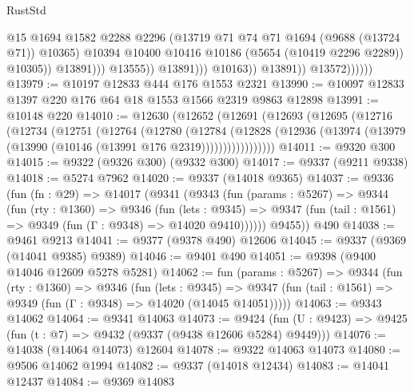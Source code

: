 \begin{lexlean}{RustStd}
\begin{coremodule}
                                            @15
                                            @1694
                                            @1582
                                            @2288
                                            @2296
                                            (@13719 @71 @74 @71 @1694 (@9688 (@13724 @71)) @10365)
                                            @10394
                                            @10400
                                            @10416
                                            @10186
                                            (@5654 (@10419 @2296 @2289))
                                            @10305))
                                        @13891)))
                                  @13555))
                              @13891)))
                        @10163))
                    @13891))
                @13572))))))
@13979 := @10197 @12833 @444 @176 @1553 @2321
@13990 := @10097 @12833 @1397 @220 @176 @64 @18 @1553 @1566 @2319 @9863 @12898
@13991 := @10148 @220
@14010 := @12630
    (@12652
      (@12691
        (@12693
          (@12695
            (@12716
              (@12734
                (@12751
                  (@12764
                    (@12780
                      (@12784
                        (@12828
                          (@12936
                            (@13974 (@13979 (@13990 (@10146 (@13991 @176 @2319)))))))))))))))))
@14011 := @9320 @300
@14015 := @9322 (@9326 @300) (@9332 @300)
@14017 := @9337 (@9211 @9338)
@14018 := @5274 @7962
@14020 := @9337 (@14018 @9365)
@14037 := @9336
    (fun (fn : @29) =>
    @14017
      (@9341
        (@9343
          (fun (params : @5267) =>
          @9344
            (fun (rty : @1360) =>
            @9346
              (fun (lets : @9345) =>
              @9347 (fun (tail : @1561) => @9349 (fun (Γ : @9348) => @14020 @9410))))))
        @9455))
    @490
@14038 := @9461 @9213
@14041 := @9377 (@9378 @490) @12606
@14045 := @9337 (@9369 (@14041 @9385) @9389)
@14046 := @9401 @490
@14051 := @9398 (@9400 @14046 @12609 @5278 @5281)
@14062 := fun (params : @5267) =>
  @9344
    (fun (rty : @1360) =>
    @9346
      (fun (lets : @9345) =>
      @9347 (fun (tail : @1561) => @9349 (fun (Γ : @9348) => @14020 (@14045 @14051)))))
@14063 := @9343 @14062
@14064 := @9341 @14063
@14073 := @9424
    (fun (U : @9423) => @9425 (fun (t : @7) => @9432 (@9337 (@9438 @12606 @5284) @9449)))
@14076 := @14038 (@14064 @14073) @12604
@14078 := @9322 @14063 @14073
@14080 := @9506 @14062 @1994
@14082 := @9337 (@14018 @12434)
@14083 := @14041 @12437
@14084 := @9369 @14083

\end{coremodule}
\end{lexlean}
